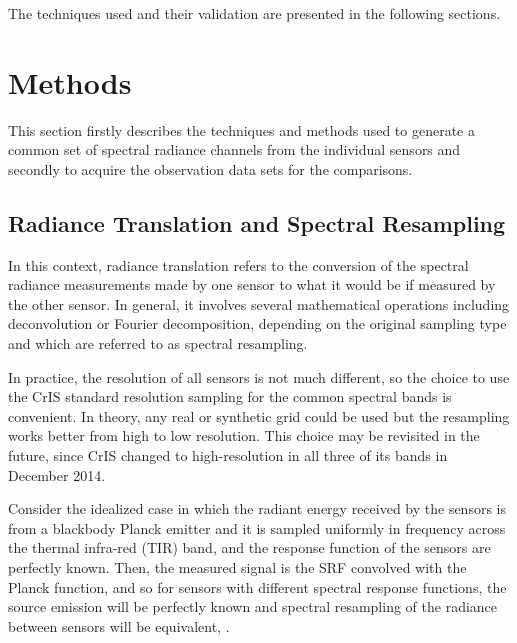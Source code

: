 \documentclass[twocolumn,10pt]{article}
\begin{document}
The techniques used and their validation are presented in the following sections.  

\section{Methods}
\label{sec:orgheadline6}

This section firstly describes the techniques and methods used to generate a common set of spectral radiance channels from the individual sensors and secondly to acquire the observation data sets for the comparisons. 

\subsection{Radiance Translation and Spectral Resampling}
\label{sec:orgheadline4}

In this context, radiance translation refers to the conversion of the spectral radiance measurements made by one sensor to what it would be if measured by the other sensor. In general, it involves several mathematical operations including deconvolution or Fourier decomposition, depending on the original sampling type and which are referred to as spectral resampling.

In practice, the resolution of all sensors is not much different, so the choice to use the CrIS standard resolution sampling for the common spectral bands is convenient. In theory, any real or synthetic grid could be used but the resampling works better from high to low resolution. This choice may be revisited in the future, since CrIS changed to high-resolution in all three of its bands in December 2014.

Consider the idealized case in which the radiant energy received by the sensors is from a blackbody Planck emitter and it is sampled uniformly in frequency across the thermal infra-red (TIR) band, and the response function of the sensors are perfectly known. Then, the measured signal is the SRF convolved with the Planck function, and so for sensors with different spectral response functions, the source emission will be perfectly known and spectral resampling of the radiance between sensors will be equivalent, \cite{Motteler2017b}. 
\end{document}
